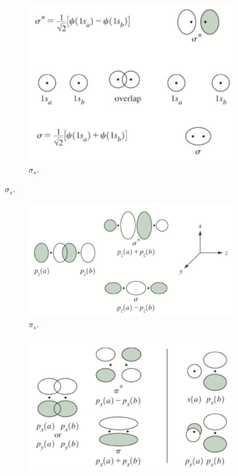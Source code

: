 \documentclass[../notes.tex]{subfiles}
\begin{document}
\begin{itemize}
\begin{itemize}
    \end{itemize}
    \begin{figure}[h!]
        \centering
        \begin{subfigure}[b]{0.63\linewidth}
            \centering
            \includegraphics[width=0.8\linewidth]{../ExtFiles/constructingMOsa.png}
            \caption{$\sigma_s$.}
            \label{fig:constructingMOsa}
        \end{subfigure}
    \end{figure}
    \begin{figure}[h!]\ContinuedFloat
        \centering
        \begin{subfigure}[b]{0.49\linewidth}
            \centering
            \includegraphics[width=0.9\linewidth]{../ExtFiles/constructingMOsb.png}
            \caption{$\pi_s$.}
            \label{fig:constructingMOsb}
        \end{subfigure}
        \begin{subfigure}[b]{0.49\linewidth}
            \centering
            \includegraphics[width=0.9\linewidth]{../ExtFiles/constructingMOsc.png}

\end{subfigure}
\end{figure}
\end{itemize}
\end{document}
